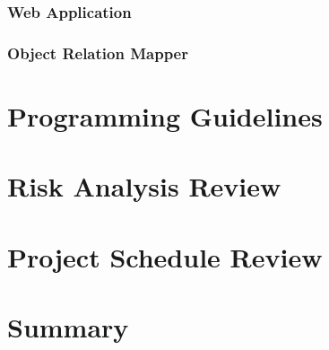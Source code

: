 \documentclass[11pt,a4paper]{article}
\begin{document}
\subsubsection{Web Application}
\subsubsection{Object Relation Mapper}

\section{Programming Guidelines}

\section{Risk Analysis Review}

\section{Project Schedule Review}

\section{Summary}

\newpage


\end{document}
